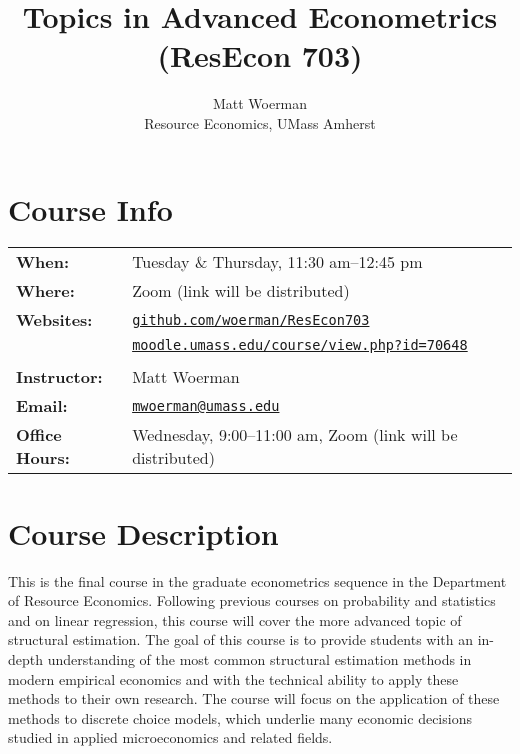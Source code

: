 \documentclass[11pt,letterpaper]{article}
\newcommand{\subtitle}[1]{%
	\posttitle{%
		\par\end{center}
	\begin{center}\large#1\end{center}
	\vskip0.5em}%
}
\begin{document}
\title{Topics in Advanced Econometrics (ResEcon 703)}
\subtitle{Fall 2020 Syllabus\vspace{-2ex}}
\author{Matt Woerman\\Resource Economics, UMass Amherst}
\date{\vspace{-5ex}}

\maketitle

\section*{Course Info}

\begin{tabular}{ll} 
	\textbf{When:} & Tuesday \& Thursday, 11:30 am--12:45 pm \\
	\textbf{Where:} & Zoom (link will be distributed) \\
	\textbf{Websites:} & \href{https://github.com/woerman/ResEcon703}{\texttt{github.com/woerman/ResEcon703}} \\
  & \href{https://moodle.umass.edu/course/view.php?id=70648}{\texttt{moodle.umass.edu/course/view.php?id=70648}} \\
	\\
	\textbf{Instructor:} & Matt Woerman \\
	\textbf{Email:} & \href{mailto:mwoerman@umass.edu}{\texttt{mwoerman@umass.edu}} \\
	\textbf{Office Hours:} & Wednesday, 9:00--11:00 am, Zoom (link will be distributed)
\end{tabular} 

\section*{Course Description}

This is the final course in the graduate econometrics sequence in the Department of Resource Economics. Following previous courses on probability and statistics and on linear regression, this course will cover the more advanced topic of structural estimation. The goal of this course is to provide students with an in-depth understanding of the most common structural estimation methods in modern empirical economics and with the technical ability to apply these methods to their own research. The course will focus on the application of these methods to discrete choice models, which underlie many economic decisions studied in applied microeconomics and related fields.
\end{document}
